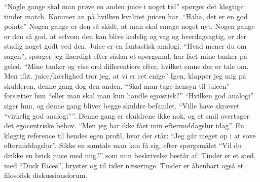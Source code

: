 \documentclass[]{article}
\begin{document}
	“Nogle gange skal man prøve en anden juice i noget tid” spørger det kløgtige tinder match.
	\newline
	\newline
	Kommer an på hvilken kvalitet juicen har.
	\newline
	\newline
	“Haha, det er en god pointe”
	\newline
	\newline
	Nogen gange er den så skidt, at man skal smage noget nyt. Nogen gange er den så god, at selvom den kan blive kedelig og vag og hverdagsagtig, er der stadig noget godt ved den.
	\newline
	\newline
	Juice er en fantastisk analogi.
	\newline
	\newline
	“Hvad mener du om sagen”, spørger jeg ihærdigt efter sådan et spørgsmål, har fået mine tanker på geled.
	\newline
	\newline
	“Mine tanker og vise ord differentiere efter, hvilket emne der er tale om. Men ifht. juice/kærlighed tror jeg, at vi er ret enige”
	\newline
	\newline
	Igen, klapper jeg mig på skulderen, denne gang dog den anden.
	\newline
	\newline
	“Skal man tage hensyn til juicen” forsætter hun “eller man skal man kun handle egoistisk?”
	\newline
	\newline
	“Hvilken god analogi” siger hun, og denne gang bliver begge skuldre befamlet.
	\newline
	\newline
	“Ville have skrævet “virkelig god analogi””. Denne gang er skuldrene ikke nok, og et smil overtager det egocentriske behov.
	\newline
	\newline
	“Men jeg har ikke fået min eftermiddagslur idag”. En kløgtig reference til hendes egen profil, hvor der står: “Jeg går meget op i at sove eftermiddagslur”.
	\newline
	\newline
	Sikke en samtale man kan få sig, efter spørgsmålet “Vil du drikke en brick juice med mig?” som min beskrivelse består af.
	\newline
	\newline
	Tinder er et sted, med “Duck Faces”, bryster og til tider næseringe.
	\newline
	\newline
	Tinder er åbenbart også et filosofisk diskussionsforum.
	
\end{document}
